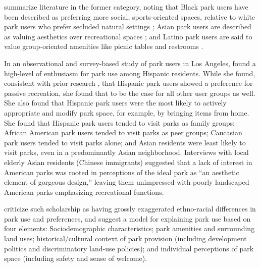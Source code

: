 \documentclass[3p, authoryear, review]{elsarticle} %
\begin{document}
\citet{byrne2009nature} summarize literature in the former category, noting that Black
park users have been described as preferring more social, sports-oriented
spaces, relative to white park users who prefer secluded natural settings
\citep{washburne1978black, hutchison1987ethnicity, floyd1999convergence, gobster2002managing, payne2002examination, ho2005gender}; Asian park users
are described as valuing aesthetics over recreational spaces
\citep{gobster2002managing, payne2002examination, ho2005gender}; and Latino park
users are said to value group-oriented amenities like picnic tables and
restrooms \citep{baas1993influence, hutchison1987ethnicity, irwin1990mexican}.

In an observational and survey-based study of park users in Los Angeles,
\citet{loukaitou1995urban} found a high-level of enthusiasm for park use among Hispanic
residents. While she found, consistent with prior research
\citep{baas1993influence, hutchison1987ethnicity, irwin1990mexican}, that
Hispanic park users showed a preference for passive recreation, she found that
to be the case for all other user groups as well. She also found that Hispanic
park users were the most likely to actively appropriate and modify park space,
for example, by bringing items from home. She found that Hispanic park users
tended to visit parks as family groups; African American park users tended to
visit parks as peer groups; Caucasian park users tended to visit parks alone;
and Asian residents were least likely to visit parks, even in a predominantly
Asian neighborhood. Interviews with local elderly Asian residents (Chinese
immigrants) suggested that a lack of interest in American parks was rooted in
perceptions of the ideal park as ``an aesthetic element of gorgeous design,''
leaving them unimpressed with poorly landscaped American parks emphasizing
recreational functions.

\citet{byrne2009nature} criticize such scholarship as having grossly exaggerated
ethno-racial differences in park use and preferences, and suggest a model for
explaining park use based on four elements: Sociodemographic characteristics;
park amenities and surrounding land uses; historical/cultural context of park
provision (including development politics and discriminatory land-use
policies); and individual perceptions of park space (including safety and
sense of welcome).
\end{document}
